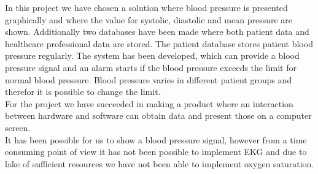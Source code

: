 In this project we have chosen a solution where blood pressure is presented graphically and where the value for systolic, diastolic and mean pressure are shown. Additionally two databases have been made where both patient data and healthcare professional data are stored. The patient database stores patient blood pressure regularly. The system has been developed, which can provide a blood pressure signal and an alarm starts if the blood pressure exceeds the limit for normal blood pressure. Blood pressure varies in different patient groups and therefor it is possible to change the limit. \\
For the project we have succeeded in making a product where an interaction between hardware and software can obtain data and present those on a computer screen. \\
It has been possible for us to show a blood pressure signal, however from a time consuming point of view it has not been possible to implement EKG and due to lake of sufficient resources we have not been able to implement oxygen saturation. 
